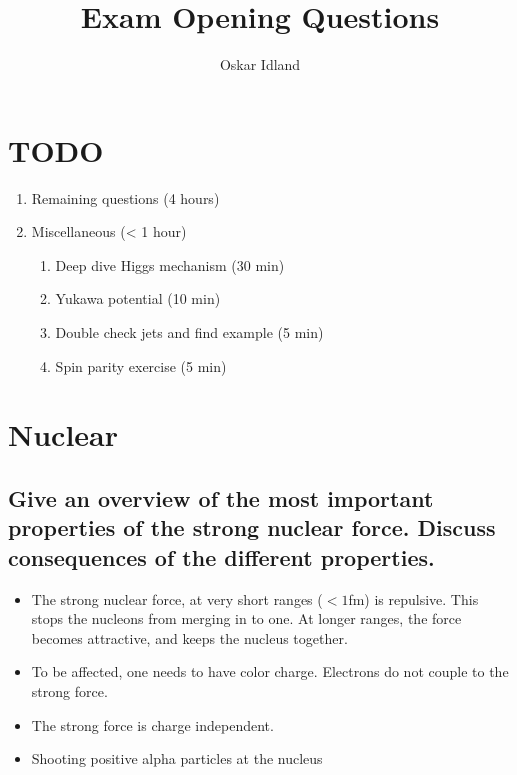 \documentclass{article}
\author{Oskar Idland}
\title{Exam Opening Questions}
\date{}
\begin{document}
\maketitle
\newpage

\section{TODO}
\begin{enumerate}
    \item Remaining questions (4 hours)
    \item Miscellaneous (< 1 hour)
    \begin{enumerate}
        \item Deep dive Higgs mechanism (30 min)
        \item Yukawa potential (10 min)
        \item Double check jets and find example (5 min)
        \item Spin parity exercise (5 min)
    \end{enumerate}
\end{enumerate}

\section{Nuclear}
\subsection{Give an overview of the most important properties of the strong nuclear force. Discuss consequences of the different properties.}
\begin{itemize}
    \item The strong nuclear force, at very short ranges ($<1$fm) is repulsive. This stops the nucleons from merging in to one. At longer ranges, the force becomes attractive, and keeps the nucleus together. 
    \item To be affected, one needs to have color charge. Electrons do not couple to the strong force.
    \item The strong force is charge independent. 
    \item Shooting positive alpha particles at the nucleus  
\end{itemize}
\end{document}
